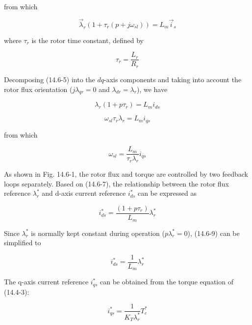 \documentclass[letterpaper,12pt]{article}
\begin{document}
from which

\begin{equation}
\vec{\lambda}_r (1 + \tau_r (p + j \omega_{sl})) = L_m \vec{i}_s \tag{14.6-5}
\end{equation}

where $\tau_r$ is the rotor time constant, defined by

\begin{equation}
\tau_r = \frac{L_r}{R_r} \tag{14.6-6}
\end{equation}

Decomposing (14.6-5) into the $dq$-axis components and taking into account the rotor flux orientation ($j \lambda_{qr} = 0$ and $\lambda_{dr} = \lambda_r$), we have

\begin{equation}
\lambda_r (1 + p \tau_r) = L_m i_{ds} \tag{14.6-7}
\end{equation}

\begin{equation}
\omega_{sl} \tau_r \lambda_r = L_m i_{qs} \tag{14.6-7}
\end{equation}

from which

\begin{equation}
\omega_{sl} = \frac{L_m}{\tau_r \lambda_r} i_{qs} \tag{14.6-8}
\end{equation}

As shown in Fig. 14.6-1, the rotor flux and torque are controlled by two feedback loops separately. Based on (14.6-7), the relationship between the rotor flux reference $\lambda_r^*$ and d-axis current reference $i_{ds}^*$ can be expressed as

\begin{equation}
i_{ds}^* = \frac{(1 + p \tau_r)}{L_m} \lambda_r^* \tag{14.6-9}
\end{equation}

Since $\lambda_r^*$ is normally kept constant during operation ($p \lambda_r^* = 0$), (14.6-9) can be simplified to

\begin{equation}
i_{ds}^* = \frac{1}{L_m} \lambda_r^* \tag{14.6-10}
\end{equation}

The q-axis current reference $i_{qs}^*$ can be obtained from the torque equation of (14.4-3):

\begin{equation}
i_{qs}^* = \frac{1}{K_T \lambda_r^*} T_e^* \tag{14.6-11}
\end{equation}
\end{document}
